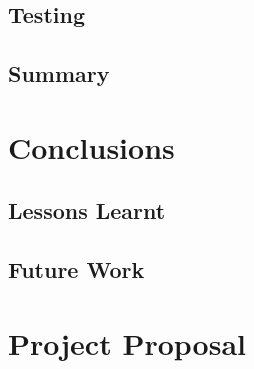 \documentclass[12pt,notitlepage,twoside]{scrreprt}
\begin{document}
\section{Testing}

\section{Summary}
\chapter{Conclusions}
\section{Lessons Learnt}
\section{Future Work}
\cleardoublepage



\cleardoublepage

\appendix

\chapter{Project Proposal}

%
\end{document}
